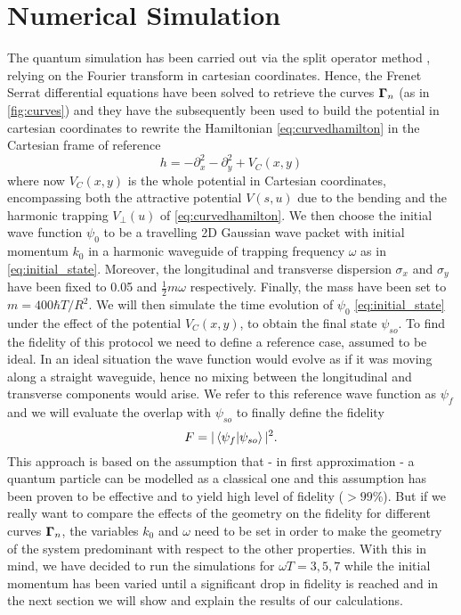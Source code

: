 \section{Numerical Simulation}
The quantum simulation has been carried out via the split operator method \cite{NoneFeit1982}, relying on the Fourier transform in cartesian coordinates.
Hence, the Frenet Serrat differential equations  have been solved to retrieve the curves $ \mathbf{\Gamma}_{n} $ (as in \cref{fig:curves}) and they have the subsequently been used to build the potential in cartesian coordinates to rewrite the Hamiltonian \cref{eq:curvedhamilton} in the Cartesian frame of reference
\begin{equation}
	\label{eq:splitophamilton}
	h = -\partial_{x}^{2}-\partial_{y}^{2} + V_{C}(x,y)
\end{equation}
where now $ V_{C}(x,y) $  is the whole potential in Cartesian coordinates, encompassing both the attractive potential $ V(s,u) $ due to the bending and the harmonic trapping $ V_{\perp}(u) $ of \cref{eq:curvedhamilton}.
We then choose the initial wave function $ \psi_{0} $ to be a travelling 2D Gaussian wave packet with initial momentum $ k_{0} $ in a harmonic waveguide of trapping frequency $ \omega $ as in \cref{eq:initial_state}.
Moreover, the longitudinal and transverse dispersion $ \sigma_{x} $  and $ \sigma_{y} $ have been fixed to 0.05 and $ \frac{1}{2} m\omega $ respectively.
Finally, the mass have been set to $ m = 400\hbar T/R^{2} $.
We will then simulate the time evolution of $ \psi_{0} $ \cref{eq:initial_state}  under the effect of the potential $ V_{C}(x,y) $, to obtain the final state $ \psi_{so} $.
To find the fidelity of this protocol we need to define a reference case, assumed to be ideal. 
In an ideal situation the wave function would evolve as if it was moving along a straight waveguide, hence no mixing between the longitudinal and transverse components would arise.
We refer to this reference wave function as $ \psi_{f} $ and we will evaluate the overlap with $ \psi_{so} $ to finally define the fidelity
\begin{equation}
	\label{eq:fidelity}
	F = |\braket{\psi_{f}|\psi_{so}}|^{2}.
\end{equation}
This approach is based on the assumption that - in first approximation - a quantum particle can be modelled as a classical one and this assumption has been proven to be effective and to yield high level of fidelity ($>99\%$).
But if we really want to compare the effects of the geometry on the fidelity for different curves $ \mathbf{\Gamma}_{n} $, the variables $ k_{0} $ and $ \omega $ need to be set in order to make the geometry of the system predominant with respect to the other properties.
With this in mind, we have decided to run the simulations for $ \omega T = 3,5,7 $ while the initial momentum has been varied until a significant drop in fidelity is reached and in the next section we will show and explain the results of our calculations.
